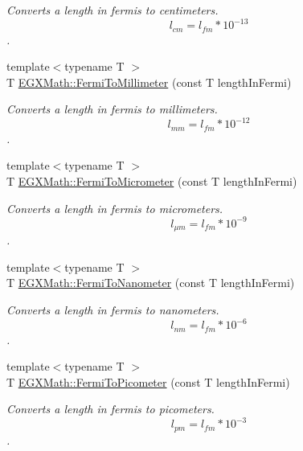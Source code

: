 \begin{DoxyCompactItemize}
\begin{DoxyCompactList}\small\item\em Converts a length in fermis to centimeters. \[ l_{cm}=l_{fm} * 10^{-13} \]. \end{DoxyCompactList}\item 
{\footnotesize template$<$typename T $>$ }\\T \mbox{\hyperlink{group___e_g_x_math-_conversions-_length_conversions-_non-_s_i-_fermi-_s_i_ga189607f0f4e5661cc0e77f93ac5be3f1}{E\+G\+X\+Math\+::\+Fermi\+To\+Millimeter}} (const T length\+In\+Fermi)
\begin{DoxyCompactList}\small\item\em Converts a length in fermis to millimeters. \[ l_{mm}=l_{fm} * 10^{-12} \]. \end{DoxyCompactList}\item 
{\footnotesize template$<$typename T $>$ }\\T \mbox{\hyperlink{group___e_g_x_math-_conversions-_length_conversions-_non-_s_i-_fermi-_s_i_ga3e8b4a4bff215efda3d05329d6a823db}{E\+G\+X\+Math\+::\+Fermi\+To\+Micrometer}} (const T length\+In\+Fermi)
\begin{DoxyCompactList}\small\item\em Converts a length in fermis to micrometers. \[ l_{\mu m}=l_{fm} * 10^{-9} \]. \end{DoxyCompactList}\item 
{\footnotesize template$<$typename T $>$ }\\T \mbox{\hyperlink{group___e_g_x_math-_conversions-_length_conversions-_non-_s_i-_fermi-_s_i_gac6be3b8925451ea542a9e5d6d780dc4c}{E\+G\+X\+Math\+::\+Fermi\+To\+Nanometer}} (const T length\+In\+Fermi)
\begin{DoxyCompactList}\small\item\em Converts a length in fermis to nanometers. \[ l_{nm}=l_{fm} * 10^{-6} \]. \end{DoxyCompactList}\item 
{\footnotesize template$<$typename T $>$ }\\T \mbox{\hyperlink{group___e_g_x_math-_conversions-_length_conversions-_non-_s_i-_fermi-_s_i_ga9d12cf46e802908b3ee6f6e1c4d8047e}{E\+G\+X\+Math\+::\+Fermi\+To\+Picometer}} (const T length\+In\+Fermi)
\begin{DoxyCompactList}\small\item\em Converts a length in fermis to picometers. \[ l_{pm}=l_{fm} * 10^{-3} \]. \end{DoxyCompactList}\item 

\end{DoxyCompactItemize}
